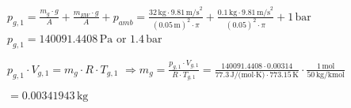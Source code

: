 \( p_{g,1} = \frac{m_{g} \cdot g}{A} + \frac{m_{EW} \cdot g}{A} + p_{amb} = \frac{32 \, \text{kg} \cdot 9.81 \, \text{m/s}^2}{(0.05 \, \text{m})^2 \cdot \pi} + \frac{0.1 \, \text{kg} \cdot 9.81 \, \text{m/s}^2}{(0.05)^2 \cdot \pi} + 1 \, \text{bar} \)  
\( p_{g,1} = 140091.4408 \, \text{Pa} \) or \( 1.4 \, \text{bar} \)  

\( p_{g,1} \cdot V_{g,1} = m_{g} \cdot R \cdot T_{g,1} \)  
\( \Rightarrow m_{g} = \frac{p_{g,1} \cdot V_{g,1}}{R \cdot T_{g,1}} = \frac{140091.4408 \cdot 0.00314}{77.3 \, \text{J/(mol·K)} \cdot 773.15 \, \text{K}} \cdot \frac{1 \, \text{mol}}{50 \, \text{kg/kmol}} \)  

\( = 0.00341943 \, \text{kg} \)